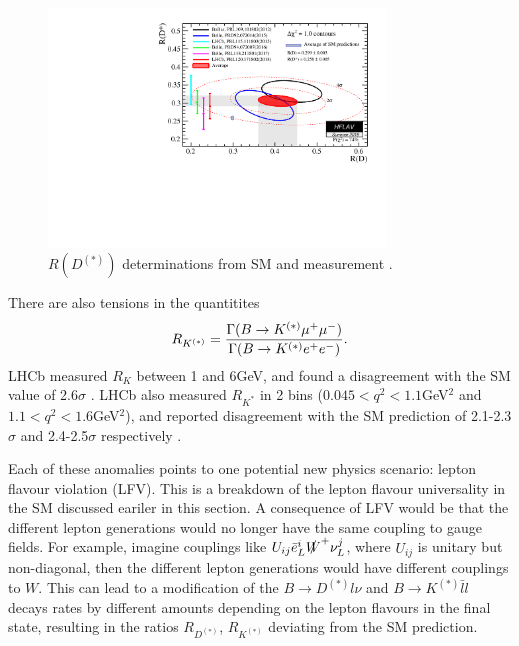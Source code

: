 \begin{figure}
  \begin{center}
    \includegraphics[width=
      0.8\textwidth]{images/rdrds_summer18.pdf}
  \end{center}
  \caption{$R(D^{(*)})$ determinations from SM and measurement
    \cite{HFLAV16}.
    \label{fig:ratiotension}}
\end{figure}

There are also tensions in the quantitites \cite{Altmannshofer:2017yso}
\begin{align}
  R_{K^{(*)}} = {\Gamma( B\to K^{(*)}\mu^+\mu^-)\over \Gamma( B\to K^{(*)} e^+e^-)}.
\end{align}
LHCb measured $R_K$ between 1 and 6GeV, and found a disagreement with the SM value \cite{Bobeth:2007dw,Bouchard:2013mia} of 2.6$\sigma$ \cite{Aaij:2014ora}. LHCb also measured $R_{K^*}$ in 2 bins ($0.045<q^2<1.1 $GeV$^2$ and $1.1<q^2<1.6$GeV$^2$), and reported disagreement with the SM prediction \cite{Bordone:2016gaq,Descotes-Genon:2015uva,Capdevila:2016ivx,Capdevila:2017ert,Serra:2016ivr,Straub:2015ica,Altmannshofer:2017fio,Jager:2014rwa} of 2.1-2.3$\sigma$ and 2.4-2.5$\sigma$ respectively \cite{Aaij:2017vbb}.


Each of these anomalies points to one potential new physics scenario: lepton flavour violation (LFV). This is a breakdown of the lepton flavour universality in the SM discussed eariler in this section. A consequence of LFV would be that the different lepton generations would no longer have the same coupling to gauge fields. For example, imagine couplings like $U_{ij} \bar{e}_L^i \slashed{W}^+ \nu_L^j$, where $U_{ij}$ is unitary but non-diagonal, then the different lepton generations would have different couplings to $W$. This can lead to a modification of the $B\to D^{(*)}l\nu$ and $B\to K^{(*)}\bar{l}l$ decays rates by different amounts depending on the lepton flavours in the final state, resulting in the ratios $R_{D^{(*)}}$, $R_{K^{(*)}}$ deviating from the SM prediction.

